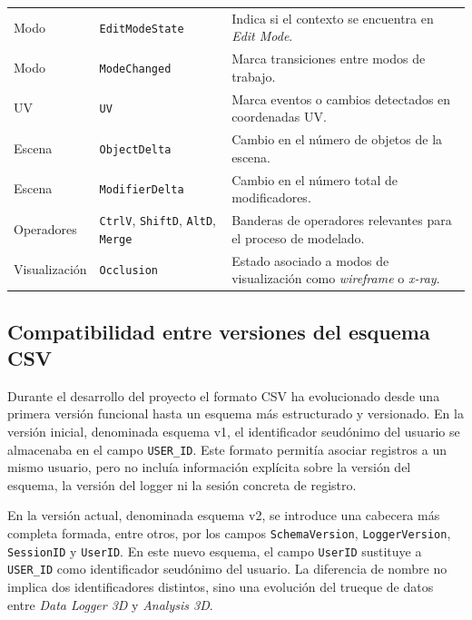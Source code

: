 {\begin{landscape}
\begin{longtable}{p{3.4cm}p{4.2cm}p{15.5cm}}
Modo & \texttt{EditModeState} & Indica si el contexto se encuentra en \textit{Edit Mode}. \\

Modo & \texttt{ModeChanged} & Marca transiciones entre modos de trabajo. \\

UV & \texttt{UV} & Marca eventos o cambios detectados en coordenadas UV. \\

Escena & \texttt{ObjectDelta} & Cambio en el número de objetos de la escena. \\

Escena & \texttt{ModifierDelta} & Cambio en el número total de modificadores. \\

Operadores & \texttt{CtrlV}, \texttt{ShiftD}, \texttt{AltD}, \texttt{Merge} & Banderas de operadores relevantes para el proceso de modelado. \\

Visualización & \texttt{Occlusion} & Estado asociado a modos de visualización como \textit{wireframe} o \textit{x-ray}. \\

\end{longtable}
\endgroup
\end{landscape}
}
\clearpage

\subsection{Compatibilidad entre versiones del esquema CSV}
\label{subsec:c-compatibilidad-csv}

Durante el desarrollo del proyecto el formato CSV ha evolucionado desde una primera versión funcional hasta un esquema más estructurado y versionado. En la versión inicial, denominada esquema v1, el identificador seudónimo del usuario se almacenaba en el campo \texttt{USER\_ID}. Este formato permitía asociar registros a un mismo usuario, pero no incluía información explícita sobre la versión del esquema, la versión del logger ni la sesión concreta de registro.

En la versión actual, denominada esquema v2, se introduce una cabecera más completa formada, entre otros, por los campos \texttt{SchemaVersion}, \texttt{LoggerVersion}, \texttt{SessionID} y \texttt{UserID}. En este nuevo esquema, el campo \texttt{UserID} sustituye a \texttt{USER\_ID} como identificador seudónimo del usuario. La diferencia de nombre no implica dos identificadores distintos, sino una evolución del trueque de datos entre \textit{Data Logger 3D} y \textit{Analysis 3D}.

